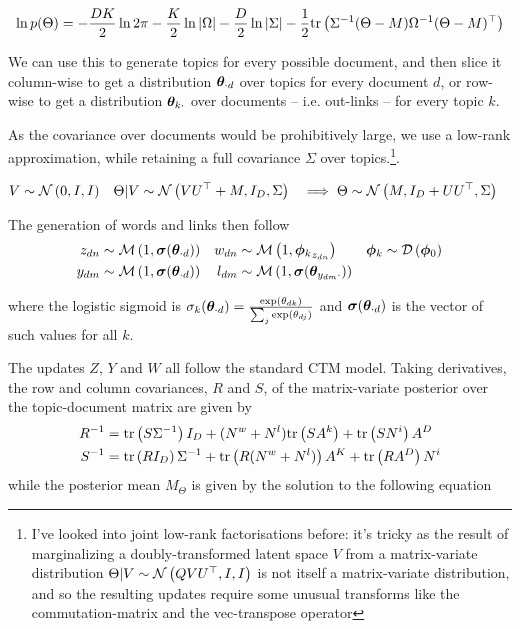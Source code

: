 \begin{equation}
\ln p(\Theta) = -\frac{DK}{2}\ln 2\pi 
- \frac{K}{2}\ln |\Omega|
- \frac{D}{2}\ln |\Sigma|
- \frac{1}{2} \text{tr} \left( {{\Sigma}^{-1}(\Theta - M){\Omega}^{-1}(\Theta - M)^\top} \right)
\end{equation}

We can use this to generate topics for every possible document, and then slice it column-wise to get a distribution ${ \bm \theta_{\cdot d} }$ over topics for every document $d$, or row-wise to get a distribution ${ \bm \theta_{k \cdot} }$ over documents -- i.e. out-links -- for every topic $k$.

As the covariance over documents would be prohibitively large, we use a low-rank approximation, while retaining a full covariance $\Sigma$ over topics.\footnote{I've looked into joint low-rank factorisations before: it's tricky as the result of marginalizing a doubly-transformed latent space $V$ from a matrix-variate distribution $\Theta|V \sim \mathcal{N} \left(QVU^\top, I, I\right)$ is not itself a matrix-variate distribution, and so the resulting updates require some unusual transforms like the commutation-matrix and the vec-transpose operator}.


\begin{align}
V & \sim \mathcal{N} \left(0, I, I\right) & 
\Theta|V & \sim \mathcal{N} \left(VU^\top + M, I_D, \Sigma\right) & \implies
\Theta & \sim \mathcal{N} \left(M, I_D + UU^\top, \Sigma\right)
\end{align}

The generation of words and links then follow
\begin{align}
z_{dn} & \sim \mathcal{M} \left( {1},{\bm \sigma({ \bm \theta_{\cdot d} })} \right) &
w_{dn} & \sim \mathcal{M} \left( {1},{{ \bm \phi_k }_{z_{dn}}} \right) &
{ \bm \phi_k }    & \sim \mathcal{D} \left( {\bm \phi_0} \right) \\
y_{dm} & \sim \mathcal{M} \left( {1},{\bm \sigma({ \bm \theta_{\cdot d} })} \right) &
l_{dm} & \sim \mathcal{M} \left( {1},{\bm \sigma(\bm \theta_{y_{dm}\cdot})} \right)
\end{align}

where the logistic sigmoid is $\sigma_k({ \bm \theta_{\cdot d} }) = \frac{\exp({ \theta_{dk} })}{\sum_j \exp(\theta_{dj})}$ and $\bm \sigma({ \bm \theta_{\cdot d} })$ is the vector of such values for all $k$.

The updates $Z$, $Y$ and $W$ all follow the standard CTM model. Taking derivatives, the row and column covariances, $R$ and $S$, of the matrix-variate posterior over the topic-document matrix are given by
\begin{align}
{R}^{-1} & = \text{tr} \left( {S {\Sigma}^{-1}} \right)I_D + (N^w + N^l)\text{tr} \left( {SA^k} \right) + \text{tr} \left( {S N^i} \right)A^D \label{eqn:post-row-cov}\\
{S}^{-1} & = \text{tr} \left( {R I_D} \right){\Sigma}^{-1} + \text{tr} \left( {R (N^w + N^l)} \right)A^K + \text{tr} \left( {R A^D} \right) N^i \label{eqn:post-col-cov}
\end{align}
while the posterior mean $M_\Theta$ is given by the solution to the following equation

